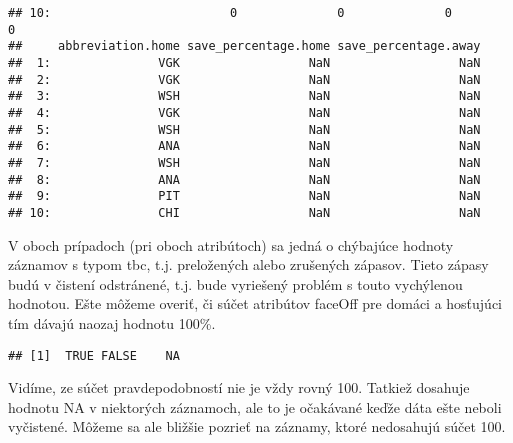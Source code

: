 \documentclass[
]{article}
\newenvironment{Shaded}{\begin{snugshade}}{\end{snugshade}}
\newcommand{\DecValTok}[1]{\textcolor[rgb]{0.00,0.00,0.81}{#1}}
\newcommand{\FunctionTok}[1]{\textcolor[rgb]{0.00,0.00,0.00}{#1}}
\newcommand{\NormalTok}[1]{#1}
\newcommand{\SpecialCharTok}[1]{\textcolor[rgb]{0.00,0.00,0.00}{#1}}
\begin{document}
\begin{verbatim}
## 10:                         0              0              0            0
##     abbreviation.home save_percentage.home save_percentage.away
##  1:               VGK                  NaN                  NaN
##  2:               VGK                  NaN                  NaN
##  3:               WSH                  NaN                  NaN
##  4:               VGK                  NaN                  NaN
##  5:               WSH                  NaN                  NaN
##  6:               ANA                  NaN                  NaN
##  7:               WSH                  NaN                  NaN
##  8:               ANA                  NaN                  NaN
##  9:               PIT                  NaN                  NaN
## 10:               CHI                  NaN                  NaN
\end{verbatim}

V oboch prípadoch (pri oboch atribútoch) sa jedná o chýbajúce hodnoty
záznamov s typom tbc, t.j. preložených alebo zrušených zápasov. Tieto
zápasy budú v čistení odstránené, t.j. bude vyriešený problém s touto
vychýlenou hodnotou. Ešte môžeme overiť, či súčet atribútov faceOff pre
domáci a hosťujúci tím dávajú naozaj hodnotu 100\%.

\begin{Shaded}
\end{Shaded}

\begin{verbatim}
## [1]  TRUE FALSE    NA
\end{verbatim}

Vidíme, ze súčet pravdepodobností nie je vždy rovný 100. Tatkiež
dosahuje hodnotu NA v niektorých záznamoch, ale to je očakávané keďže
dáta ešte neboli vyčistené. Môžeme sa ale bližšie pozrieť na záznamy,
ktoré nedosahujú súčet 100.

\begin{Shaded}
\end{Shaded}
\end{document}
